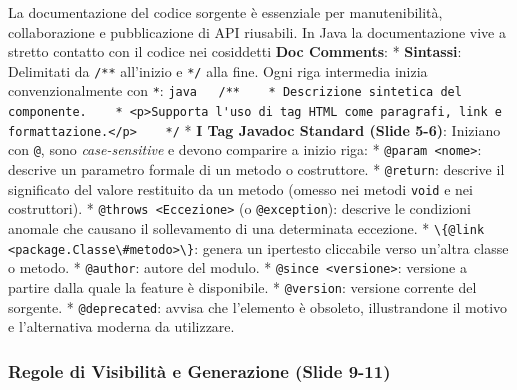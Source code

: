 \documentclass[11pt,a4paper,oneside]{report}
\newcommand{\passthrough}[1]{#1}
\begin{document}
La documentazione del codice sorgente è essenziale per manutenibilità,
collaborazione e pubblicazione di API riusabili. In Java la
documentazione vive a stretto contatto con il codice nei cosiddetti
\textbf{Doc Comments}: * \textbf{Sintassi}: Delimitati da
\passthrough{\lstinline!/**!} all'inizio e \passthrough{\lstinline!*/!}
alla fine. Ogni riga intermedia inizia convenzionalmente con
\passthrough{\lstinline!*!}:
\passthrough{\lstinline!java   /**    * Descrizione sintetica del componente.    * <p>Supporta l'uso di tag HTML come paragrafi, link e formattazione.</p>    */!}
* \textbf{I Tag Javadoc Standard (Slide 5-6)}: Iniziano con
\passthrough{\lstinline!@!}, sono \emph{case-sensitive} e devono
comparire a inizio riga: * \passthrough{\lstinline!@param <nome>!}:
descrive un parametro formale di un metodo o costruttore. *
\passthrough{\lstinline!@return!}: descrive il significato del valore
restituito da un metodo (omesso nei metodi
\passthrough{\lstinline!void!} e nei costruttori). *
\passthrough{\lstinline!@throws <Eccezione>!} (o
\passthrough{\lstinline!@exception!}): descrive le condizioni anomale
che causano il sollevamento di una determinata eccezione. *
\passthrough{\lstinline!\{@link <package.Classe\#metodo>\}!}: genera un
ipertesto cliccabile verso un'altra classe o metodo. *
\passthrough{\lstinline!@author!}: autore del modulo. *
\passthrough{\lstinline!@since <versione>!}: versione a partire dalla
quale la feature è disponibile. * \passthrough{\lstinline!@version!}:
versione corrente del sorgente. * \passthrough{\lstinline!@deprecated!}:
avvisa che l'elemento è obsoleto, illustrandone il motivo e
l'alternativa moderna da utilizzare.

\subsubsection{Regole di Visibilità e Generazione (Slide
9-11)}\label{chap18_regole-di-visibilituxe0-e-generazione-slide-9-11}
\end{document}
